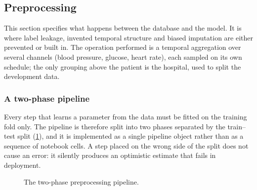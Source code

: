 \subsection{Preprocessing}\label{sec:preprocessing}

This section specifies what happens between the database and the model. It is where label leakage, invented temporal structure and biased imputation are either prevented or built in. The operation performed is a temporal aggregation over several channels (blood pressure, glucose, heart rate), each sampled on its own schedule; the only grouping above the patient is the hospital, used to split the development data.

\subsubsection{A two-phase pipeline}\label{sec:pipeline}

Every step that learns a parameter from the data must be fitted on the training fold only. The pipeline is therefore split into two phases separated by the train--test split (\cref{fig:pipeline-phases}), and it is implemented as a single pipeline object rather than as a sequence of notebook cells. A step placed on the wrong side of the split does not cause an error: it silently produces an optimistic estimate that fails in deployment.

\begin{figure}[htbp]
\centering
{}
\caption{The two-phase preprocessing pipeline.}\label{fig:pipeline-phases}
\end{figure}

